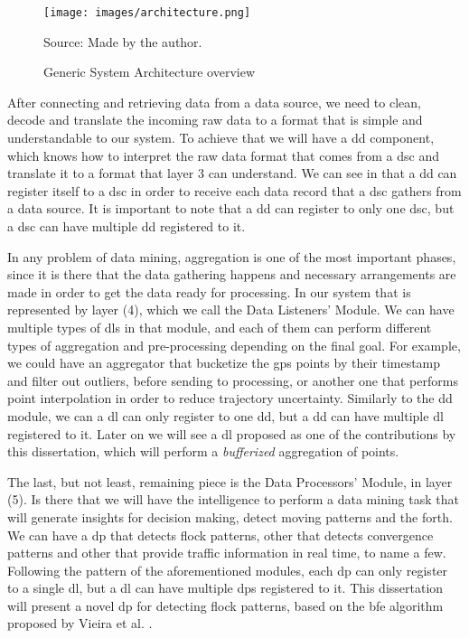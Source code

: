 \begin{figure}[h!]
    \centering
    \caption{Generic System Architecture overview}
    \centerline{\texttt{[image: images/architecture.png]}}
    \footnotesize{Source: Made by the author.}
    \label{fig:architecture}
\end{figure}

After connecting and retrieving data from a data source, we need to clean, decode and translate the incoming raw data to
a format that is simple and understandable to our system. To achieve that we will have a \ac{dd} component, which knows
how to interpret the raw data format that comes from a \ac{dsc} and translate it to a format that layer 3 can
understand. We can see in  that a \ac{dd} can register itself to a \ac{dsc} in order to receive
each data record that a \ac{dsc} gathers from a data source. It is important to note that a \ac{dd} can register to only
one \ac{dsc}, but a \ac{dsc} can have multiple \ac{dd} registered to it.

In any problem of data mining, aggregation is one of the most important phases, since it is there that the data
gathering happens and necessary arrangements are made in order to get the data ready for processing. In our system that
is represented by layer (4), which we call the Data Listeners' Module. We can have multiple types of \acp{dl} in that
module, and each of them can perform different types of aggregation and pre-processing depending on the final goal.  For
example, we could have an aggregator that bucketize the \ac{gps} points by their timestamp and filter out outliers,
before sending to processing, or another one that performs point interpolation in order to reduce trajectory
uncertainty. Similarly to the \ac{dd} module, we can a \ac{dl} can only register to one \ac{dd}, but a \ac{dd} can have
multiple \ac{dl} registered to it. Later on we will see a \ac{dl} proposed as one of the contributions by this
dissertation, which will perform a \textit{bufferized} aggregation of points.

The last, but not least, remaining piece is the Data Processors' Module, in layer (5). Is there that we will have the
intelligence to perform a data mining task that will generate insights for decision making, detect moving patterns and
the forth. We can have a \ac{dp} that detects flock patterns, other that detects convergence patterns and other that
provide traffic information in real time, to name a few. Following the pattern of the aforementioned modules, each
\ac{dp} can only register to a single \ac{dl}, but a \ac{dl} can have multiple \ac{dp}s registered to it. This
dissertation will present a novel \ac{dp} for detecting flock patterns, based on the \ac{bfe} algorithm proposed by
Vieira et al. \citep{vieira}.

